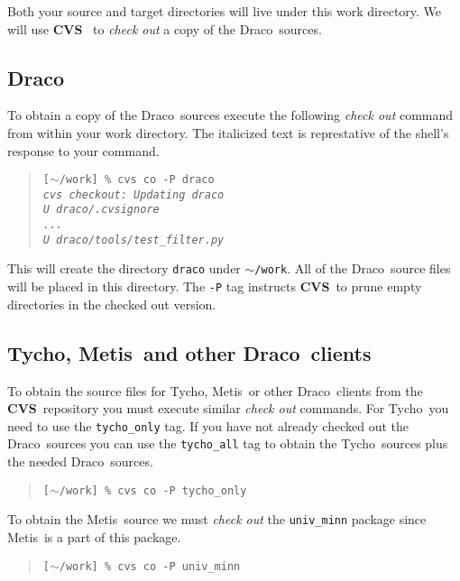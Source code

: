 \documentclass[11pt]{nmemo}
\newcommand{\comp}[1]{\normalfont\normalsize\texttt{#1}}
\newcommand{\draco}{{\normalfont\sffamily Draco}}
\newcommand{\tycho}{{\normalfont\sffamily Tycho}}
\newcommand{\metis}{{\normalfont\sffamily Metis}}
\newcommand{\cvs}{{\normalfont\bfseries CVS}}
\begin{document}
Both your source and target directories will live under this work
directory.  We will use \cvs~\cite{cvs} to \emph{check out} a copy of
the \draco\ sources.  

\subsection{\draco}

To obtain a copy of the \draco\ sources execute the following
\emph{check out} command from within your work directory.  The
italicized text is represtative of the shell's response to your
command.

\begin{verse}
\texttt{[$\sim$/work] \% cvs co -P draco \\
\emph{cvs checkout: Updating draco \\
U draco/.cvsignore \\
      ... \\
U draco/tools/test\_filter.py}}
\end{verse}

This will create the directory \comp{draco} under \comp{$\sim$/work}.  All
of the \draco\ source files will be placed in this directory.  The
\comp{-P} tag instructs \cvs\ to prune empty directories in the
checked out version.  

\subsection{\tycho, \metis\ and other \draco\ clients}

To obtain the source files for \tycho, \metis\ or other \draco\ 
clients from the \cvs\ repository you must execute similar 
\emph{check out} commands.  For \tycho\ you need to use the
\comp{tycho\_only} tag.  If you have not already checked out the
\draco\ sources you can use the \comp{tycho\_all} tag to obtain the
\tycho\ sources plus the needed \draco\ sources.

\begin{verse}
\texttt{[$\sim$/work] \% cvs co -P tycho\_only}
\end{verse}

To obtain the \metis\ source we must \emph{check out} the
\comp{univ\_minn} package since \metis\ is a part of this package.

\begin{verse}
\texttt{[$\sim$/work] \% cvs co -P univ\_minn}
\end{verse}
\end{document}
